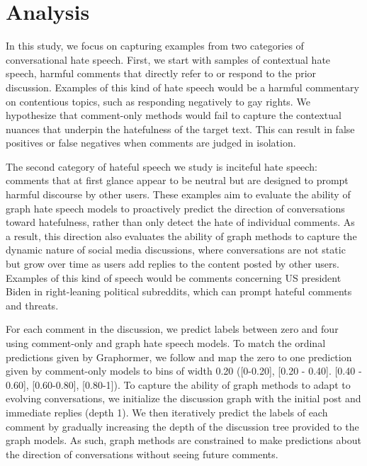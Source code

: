 \documentclass[letterpaper]{article} %
\begin{document}
\section{Analysis}
In this study, we focus on capturing examples from two categories of conversational hate speech. First, we start with samples of contextual hate speech, harmful comments that directly refer to or respond to the prior discussion. Examples of this kind of hate speech would be a harmful commentary on contentious topics, such as responding negatively to gay rights. We hypothesize that comment-only methods would fail to capture the contextual nuances that underpin the hatefulness of the target text. This can result in false positives or false negatives when comments are judged in isolation.

The second category of hateful speech we study is inciteful hate speech: comments that at first glance appear to be neutral but are designed to prompt harmful discourse by other users. These examples aim to evaluate the ability of graph hate speech models to proactively predict the direction of conversations toward hatefulness, rather than only detect the hate of individual comments. As a result, this direction also evaluates the ability of graph methods to capture the dynamic nature of social media discussions, where conversations are not static but grow over time as users add replies to the content posted by other users. Examples of this kind of speech would be comments concerning US president Biden in right-leaning political subreddits, which can prompt hateful comments and threats.

For each comment in the discussion, we predict labels between zero and four using comment-only and graph hate speech models. To match the ordinal predictions given by Graphormer, we follow \citet{hebert2022predicting} and map the zero to one prediction given by comment-only models to bins of width 0.20 ([0-0.20], [0.20 - 0.40]. [0.40 - 0.60], [0.60-0.80], [0.80-1]). To capture the ability of graph methods to adapt to evolving conversations, we initialize the discussion graph with the initial post and immediate replies (depth 1). We then iteratively predict the labels of each comment by gradually increasing the depth of the discussion tree provided to the graph models. As such, graph methods are constrained to make predictions about the direction of conversations without seeing future comments.
\end{document}
